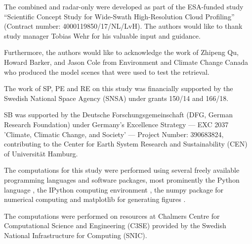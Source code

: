 \documentclass[journal abbreviation, manuscript]{copernicus}
\begin{document}

\begin{acknowledgements}

The combined and radar-only were developed as part of the ESA-funded study
``Scientific Concept Study for Wide-Swath High-Resolution Cloud Profiling''
(Contract number: 4000119850/17/NL/LvH). The authors would like to thank
study manager Tobias Wehr for his valuable input and guidance.

Furthermore, the authors would like to acknowledge the work of Zhipeng Qu,
Howard Barker, and Jason Cole from Environment and Climate Change Canada who
produced the model scenes that were used to test the retrieval.

The work of SP, PE and RE on this study was financially supported by the Swedish
National Space Agency (SNSA) under grants 150/14 and 166/18.

SB was supported by the Deutsche Forschungsgemeinschaft (DFG, German Research
Foundation) under Germany's Excellence Strategy --- EXC 2037 'Climate, Climatic
Change, and Society' --- Project Number: 390683824, contributing to the Center
for Earth System Research and Sustainability (CEN) of Universit\"{a}t Hamburg.

The computations for this study were performed using several freely available programming
languages and software packages, most prominently the Python language
\citep{python}, the IPython computing environment \citep{ipython}, the numpy
package for numerical computing \citep{numpy} and matplotlib for generating
figures \citep{matplotlib}.

The computations were performed on resources at Chalmers Centre for
Computational Science and Engineering (C3SE) provided by the Swedish National
Infrastructure for Computing (SNIC).

\end{acknowledgements}










\end{document}
